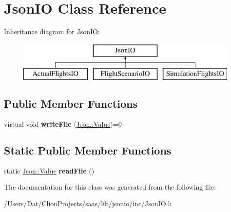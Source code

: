 \hypertarget{class_json_i_o}{}\section{Json\+IO Class Reference}
\label{class_json_i_o}
Inheritance diagram for Json\+IO\+:\begin{figure}[H]
\begin{center}
\leavevmode
\includegraphics[height=2.000000cm]{class_json_i_o}
\end{center}
\end{figure}
\subsection*{Public Member Functions}
\begin{DoxyCompactItemize}
\item 
virtual void {\bfseries write\+File} (\hyperlink{class_json_1_1_value}{Json\+::\+Value})=0\hypertarget{class_json_i_o_af6f8a61815323ac89752b5365fb2acab}{}\label{class_json_i_o_af6f8a61815323ac89752b5365fb2acab}

\end{DoxyCompactItemize}
\subsection*{Static Public Member Functions}
\begin{DoxyCompactItemize}
\item 
static \hyperlink{class_json_1_1_value}{Json\+::\+Value} {\bfseries read\+File} ()\hypertarget{class_json_i_o_a95a39d392f3f27bb94dc5ad5ef3dba19}{}\label{class_json_i_o_a95a39d392f3f27bb94dc5ad5ef3dba19}

\end{DoxyCompactItemize}


The documentation for this class was generated from the following file\+:\begin{DoxyCompactItemize}
\item 
/\+Users/\+Dat/\+Clion\+Projects/saas/lib/jsonio/inc/Json\+I\+O.\+h\end{DoxyCompactItemize}
